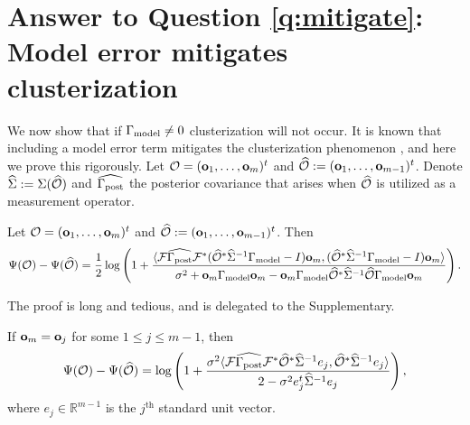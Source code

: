 \section{Answer to Question \ref{q:mitigate}: Model error mitigates clusterization}\label{section:non_vanishing}
We now show that if $\Gamma_{\textup{model}} \neq 0$ clusterization will not occur. It
is known that including a model error term mitigates the
clusterization phenomenon \cite{Ucinski05}, and here we prove this
rigorously. Let $\mathcal{O} = (\mathbf{o}_1,\dots,\mathbf{o}_m)^t$ and $\widehat{\mathcal{O}} :=
(\mathbf{o}_1,\dots,\mathbf{o}_{m-1})^t$. Denote $\widehat{\Sigma} := \Sigma (\widehat{\mathcal{O}})$ and
$\widehat{\Gamma_{\textup{post}}}$ the posterior covariance that arises when $\widehat{\mathcal{O}}$ is
utilized as a measurement operator.

\begin{proposition}\label{prop:design_increase}
  Let $\mathcal{O} = (\mathbf{o}_1,\dots,\mathbf{o}_m)^t$ and $\widehat{\mathcal{O}} :=
  (\mathbf{o}_1,\dots,\mathbf{o}_{m-1})^t$. Then
  \begin{equation}\label{eq:conclusion}
    \tar( \obs ) - \tar (\obsm ) =
    \frac12 \log \left ( 1 + \frac{
      \langle \fwd \postcovm \fwd^* (\obsm^* \Sigmam^{-1} \modcov - I ) \meas_m,
      (\obsm^* \Sigmam^{-1} \modcov - I ) \meas_m \rangle
    }{
      \sigma^2 + \meas_m \modcov \meas_m - \meas_m \modcov \obsm^* \Sigmam^{-1} \obsm \modcov \meas_m 
    }       
    \right ).
  \end{equation}
\end{proposition}
The proof is long and tedious, and is delegated to the Supplementary.


\begin{corollary}\label{cor:same_meas}
  If $\mathbf{o}_m = \mathbf{o}_j$ for some $1 \leq j \leq m-1$, then
  \begin{equation*}
    \tar(\obs) - \tar(\obsm) =
    \log \left ( 1 + \frac{\sigma^2
      \langle \fwd \postcovm \fwd^* \obsm^* \Sigmam^{-1} e_j,
      \obsm^* \Sigmam^{-1}e_j \rangle
    }{
      2 - \sigma^2 e_j^t\Sigmam^{-1}e_j 
    }       
    \right ),
  \end{equation*}
  where $e_j\in \mathbb{R}^{m-1}$ is the $j^{\text{th}}$ standard unit
  vector.
\end{corollary}

